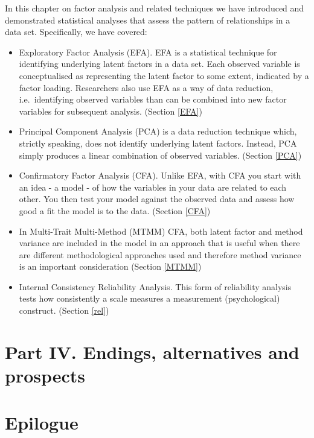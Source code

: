 \documentclass[
]{book}
\providecommand{\tightlist}{%
  \setlength{\itemsep}{0pt}\setlength{\parskip}{0pt}}
\begin{document}
In this chapter on factor analysis and related techniques we have introduced and demonstrated statistical analyses that assess the pattern of relationships in a data set. Specifically, we have covered:

\begin{itemize}
\tightlist
\item
  Exploratory Factor Analysis (EFA). EFA is a statistical technique for identifying underlying latent factors in a data set. Each observed variable is conceptualised as representing the latent factor to some extent, indicated by a factor loading. Researchers also use EFA as a way of data reduction, i.e.~identifying observed variables than can be combined into new factor variables for subsequent analysis. (Section \ref{EFA})
\item
  Principal Component Analysis (PCA) is a data reduction technique which, strictly speaking, does not identify underlying latent factors. Instead, PCA simply produces a linear combination of observed variables. (Section \ref{PCA})
\item
  Confirmatory Factor Analysis (CFA). Unlike EFA, with CFA you start with an idea - a model - of how the variables in your data are related to each other. You then test your model against the observed data and assess how good a fit the model is to the data. (Section \ref{CFA})
\item
  In Multi-Trait Multi-Method (MTMM) CFA, both latent factor and method variance are included in the model in an approach that is useful when there are different methodological approaches used and therefore method variance is an important consideration (Section \ref{MTMM})
\item
  Internal Consistency Reliability Analysis. This form of reliability analysis tests how consistently a scale measures a measurement (psychological) construct. (Section \ref{rel})
\end{itemize}

\hypertarget{part-iv.-endings-alternatives-and-prospects}{%
\chapter*{Part IV. Endings, alternatives and prospects}\label{part-iv.-endings-alternatives-and-prospects}}

\hypertarget{epilogue}{%
\chapter{Epilogue}\label{epilogue}}
\end{document}
